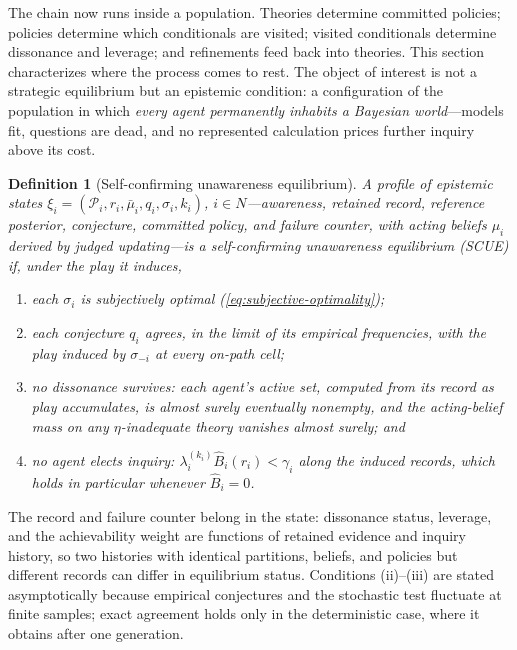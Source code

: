 \documentclass[11pt]{article}
\newtheorem{definition}[assumption]{Definition}
\theoremstyle{definition}
\begin{document}
The chain now runs inside a population.  Theories determine committed
policies; policies determine which conditionals are visited; visited
conditionals determine dissonance and leverage; and refinements feed back
into theories.  This section characterizes where the process comes to rest.
The object of interest is not a strategic equilibrium but an epistemic
condition: a configuration of the population in which \emph{every agent
permanently inhabits a Bayesian world}---models fit, questions are dead, and
no represented calculation prices further inquiry above its cost.

\begin{definition}[Self-confirming unawareness equilibrium]
\label{def:scue}
A profile of epistemic states
$\xi_i=(\mathcal P_i,r_i,\bar\mu_i,q_i,\sigma_i,k_i)$, $i\in N$---awareness,
retained record, reference posterior, conjecture, committed policy, and
failure counter, with acting beliefs $\mu_i$ derived by judged updating---is a
\emph{self-confirming unawareness equilibrium} (SCUE) if, under the play it
induces,
\begin{enumerate}[label=(\roman*)]
  \item each $\sigma_i$ is subjectively optimal
  (\cref{eq:subjective-optimality});
  \item each conjecture $q_i$ agrees, in the limit of its empirical
  frequencies, with the play induced by $\sigma_{-i}$ at every on-path cell;
  \item no dissonance survives: each agent's active set, computed from its
  record as play accumulates, is almost surely eventually nonempty, and the
  acting-belief mass on any $\eta$-inadequate theory vanishes almost surely;
  and
  \item no agent elects inquiry:
  $\lambda_i^{(k_i)}\widehat B_i(r_i)<\gamma_i$ along the induced records,
  which holds in particular whenever $\widehat B_i=0$.
\end{enumerate}
\end{definition}

The record and failure counter belong in the state: dissonance status,
leverage, and the achievability weight are functions of retained evidence and
inquiry history, so two histories with identical partitions, beliefs, and
policies but different records can differ in equilibrium status.  Conditions
(ii)--(iii) are stated asymptotically because empirical conjectures and the
stochastic test fluctuate at finite samples; exact agreement holds only in the
deterministic case, where it obtains after one generation.
\end{document}

